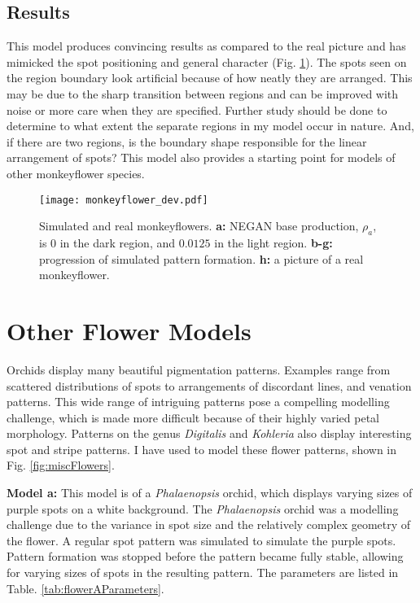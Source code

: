 \subsection*{Results}
This model produces convincing results as compared to the real picture and has mimicked the spot positioning and general character (Fig. \ref{fig:monkeyflower}). The spots seen on the region boundary look artificial because of how neatly they are arranged. This may be due to the sharp transition between regions and can be improved with noise or more care when they are specified. Further study should be done to determine to what extent the separate regions in my model occur in nature. And, if there are two regions, is the boundary shape responsible for the linear arrangement of spots? This model also provides a starting point for models of other monkeyflower species.

\begin{figure}[ht]
	\centering
	\texttt{[image: monkeyflower\_dev.pdf]}
	\caption[Simulated and real monkeyflowers]{Simulated and real monkeyflowers. \textbf{a:} NEGAN base production, $\rho_a$, is 0 in the dark region, and $0.0125$ in the light region. \textbf{b-g:} progression of simulated pattern formation. \textbf{h:} a picture of a real monkeyflower.}
	\label{fig:monkeyflower}
\end{figure}

\section{Other Flower Models}
Orchids display many beautiful pigmentation patterns. Examples range from scattered distributions of spots to arrangements of discordant lines, and venation patterns. This wide range of intriguing patterns pose a compelling modelling challenge, which is made more difficult because of their highly varied petal morphology. Patterns on the genus \textit{Digitalis} and \textit{Kohleria} also display interesting spot and stripe patterns. I have used \ProgramName{} to model these flower patterns, shown in Fig. \ref{fig:miscFlowers}.

\textbf{Model a:} 
This model is of a \textit{Phalaenopsis} orchid, which displays varying sizes of purple spots on a white background. The \textit{Phalaenopsis} orchid was a modelling challenge due to the variance in spot size and the relatively complex geometry of the flower. A regular spot pattern was simulated to simulate the purple spots. Pattern formation was stopped before the pattern became fully stable, allowing for varying sizes of spots in the resulting pattern. The parameters are listed in Table. \ref{tab:flowerAParameters}.

